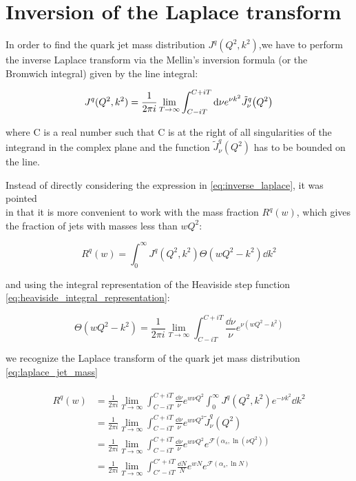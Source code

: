 \documentclass[../main.tex]{subfiles}
\begin{document}
\section{Inversion of the Laplace transform}

In order to find the quark jet mass distribution $J^q(Q^2,k^2)$,we have to perform the inverse Laplace transform via 
the Mellin's inversion formula (or the Bromwich integral) given by the line integral: 

\begin{equation} \label{eq:inverse_laplace}
    J^q(Q^2,k^2) = \frac{1}{2\pi i} \lim_{T \to \infty}\int_{C-iT}^{C+iT} \dd \nu e^{\nu k^2} \tilde{J}^q_\nu \qty(Q^2)
\end{equation}

where C is a real number such that C is at the right of all singularities of the integrand in the complex plane and
the function $\tilde{J}^q_\nu(Q^2)$ has to be bounded on the line.

Instead of directly considering the expression in \cref{eq:inverse_laplace}, it was pointed \\
in \cite{CATANI19933} that it is more convenient to work with the mass fraction $R^q(w)$, 
which gives the fraction of jets with masses less than $wQ^2$:

\begin{equation}\label{eq:jet mass fraction}
    R^q(w) = \int_0^\infty J^q(Q^2,k^2)\Theta(wQ^2-k^2) \dd k^2
\end{equation}

and using the integral representation of the Heaviside step function \cref{eq:heaviside_integral_representation}:

\begin{equation}
    \Theta(wQ^2-k^2) = \frac{1}{2\pi i} \lim_{T \to \infty}\int_{C-iT}^{C+iT} \frac{\dd \nu}{\nu} e^{\nu (wQ^2-k^2)} 
\end{equation}

we recognize the Laplace transform of the quark jet mass distribution \cref{eq:laplace_jet_mass}

\begin{align}
    \begin{split}\label{eq:Rw mass fraction}
        R^q(w) &= \frac{1}{2\pi i} \lim_{T \to \infty} \int_{C-iT}^{C+iT} \frac{\dd \nu}{\nu} e^{w \nu Q^2} \int_0^\infty J^q(Q^2,k^2) e^{-\nu k^2} \dd k^2 \\
        &= \frac{1}{2\pi i} \lim_{T \to \infty} \int_{C-iT}^{C+iT} \frac{\dd \nu}{\nu} e^{w \nu Q^2} \tilde{J}^q_\nu(Q^2) \\
        &= \frac{1}{2\pi i} \lim_{T \to \infty} \int_{C-iT}^{C+iT} \frac{\dd \nu}{\nu} e^{w \nu Q^2} e^{\mathcal{F}(\alpha_s,\ln(\nu Q^2))}\\
        &= \frac{1}{2\pi i} \lim_{T \to \infty} \int_{C'-iT}^{C'+iT} \frac{\dd N}{N} e^{w N} e^{\mathcal{F}(\alpha_s,\ln N)}
    \end{split}
\end{align}
\end{document}

